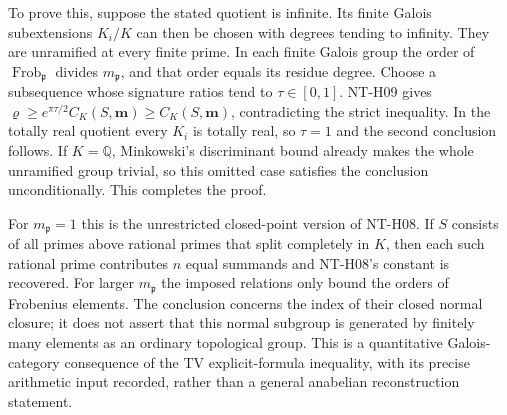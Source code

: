 To prove this, suppose the stated quotient is infinite.  Its finite
Galois subextensions $K_i/K$ can then be chosen with degrees tending
to infinity.  They are unramified at every finite prime.  In each
finite Galois group the order of
$\operatorname{Frob}_{\mathfrak p}$ divides
$m_{\mathfrak p}$, and that order equals its residue degree.
Choose a subsequence whose signature ratios tend to
$\tau\in[0,1]$.  NT-H09 gives
$\varrho\ge e^{\pi\tau/2}C_K(S,\boldsymbol m)
\ge C_K(S,\boldsymbol m)$, contradicting the strict inequality.
In the totally real quotient every $K_i$ is totally real, so
$\tau=1$ and the second conclusion follows.  If $K=\mathbb Q$,
Minkowski's discriminant bound already makes the whole unramified
group trivial, so this omitted case satisfies the conclusion
unconditionally.  This completes the proof.

For $m_{\mathfrak p}=1$ this is the unrestricted closed-point
version of NT-H08.  If $S$ consists of all primes above rational
primes that split completely in $K$, then each such rational prime
contributes $n$ equal summands and NT-H08's constant is recovered.
For larger $m_{\mathfrak p}$ the imposed relations only bound the
orders of Frobenius elements.  The conclusion concerns the index
of their closed normal closure; it does not assert that this normal
subgroup is generated by finitely many elements as an ordinary
topological group.  This is a quantitative Galois-category
consequence of the TV explicit-formula inequality, with its precise
arithmetic input recorded, rather than a general anabelian
reconstruction statement.
